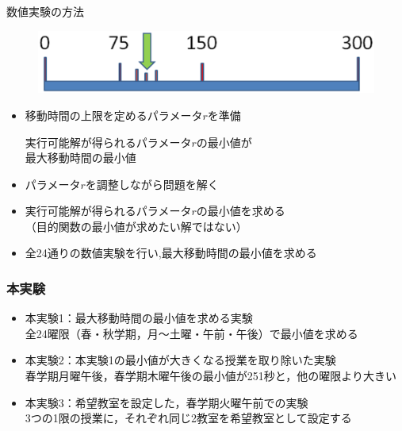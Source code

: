 \documentclass[dvipdfmx,12pt]{beamer}
\begin{document}
\begin{frame}{数値実験の方法}
\begin{figure}[thpb]
\begin{center}
\includegraphics[scale=0.5]{nibuntansa.eps}
\hspace{-10mm} 
\vspace{-5mm}
\end{center}
\end{figure}

\begin{itemize}
\item 移動時間の上限を定めるパラメータ$r$を準備\\
\begin{screen}
\begin{center}
\vspace{-2mm}
実行可能解が得られるパラメータ$r$の最小値が\\最大移動時間の最小値
\vspace{-3mm}
\end{center}
\end{screen}
\item パラメータ$r$を調整しながら問題を解く\\
\item 実行可能解が得られるパラメータ$r$の最小値を求める\\
（目的関数の最小値が求めたい解ではない）
\item 全24通りの数値実験を行い,最大移動時間の最小値を求める\\

\end{itemize}
\end{frame}



\begin{frame}\frametitle{本実験}
\begin{itemize}
\item 本実験1：最大移動時間の最小値を求める実験\\
\vspace{5pt}
全24曜限（春・秋学期，月～土曜・午前・午後）で最小値を求める\\
\item 本実験2：本実験1の最小値が大きくなる授業を取り除いた実験\\
\vspace{5pt}
春学期月曜午後，春学期木曜午後の最小値が251秒と，他の曜限より大きい\\
\item 本実験3：希望教室を設定した，春学期火曜午前での実験\\
\vspace{5pt}
3つの1限の授業に，それぞれ同じ2教室を希望教室として設定する\\
\end{itemize}
\end{frame}
\fi
\end{document}
